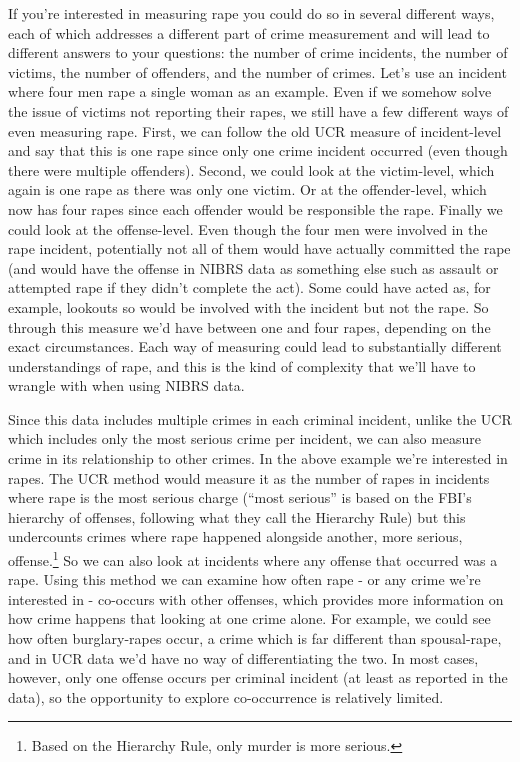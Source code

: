 \documentclass[
]{krantz}
\begin{document}
If you're interested in measuring rape you could do so in
several different ways, each of which addresses a different
part of crime measurement and will lead to different answers
to your questions: the number of crime incidents, the number
of victims, the number of offenders, and the number of
crimes. Let's use an incident where four men rape a single
woman as an example. Even if we somehow solve the issue of
victims not reporting their rapes, we still have a few
different ways of even measuring rape. First, we can follow
the old UCR measure of incident-level and say that this is
one rape since only one crime incident occurred (even though
there were multiple offenders). Second, we could look at the
victim-level, which again is one rape as there was only one
victim. Or at the offender-level, which now has four rapes
since each offender would be responsible the rape. Finally
we could look at the offense-level. Even though the four men
were involved in the rape incident, potentially not all of
them would have actually committed the rape (and would have
the offense in NIBRS data as something else such as assault
or attempted rape if they didn't complete the act). Some
could have acted as, for example, lookouts so would be
involved with the incident but not the rape. So through this
measure we'd have between one and four rapes, depending on
the exact circumstances. Each way of measuring could lead to
substantially different understandings of rape, and this is
the kind of complexity that we'll have to wrangle with when
using NIBRS data.

Since this data includes multiple crimes in each criminal
incident, unlike the UCR which includes only the most
serious crime per incident, we can also measure crime in its
relationship to other crimes. In the above example we're
interested in rapes. The UCR method would measure it as the
number of rapes in incidents where rape is the most serious
charge (``most serious'' is based on the FBI's hierarchy of
offenses, following what they call the Hierarchy Rule) but
this undercounts crimes where rape happened alongside
another, more serious, offense.\footnote{Based on the
  Hierarchy Rule, only murder is more serious.} So we can
also look at incidents where any offense that occurred was a
rape. Using this method we can examine how often rape - or
any crime we're interested in - co-occurs with other
offenses, which provides more information on how crime
happens that looking at one crime alone. For example, we
could see how often burglary-rapes occur, a crime which is
far different than spousal-rape, and in UCR data we'd have
no way of differentiating the two. In most cases, however,
only one offense occurs per criminal incident (at least as
reported in the data), so the opportunity to explore
co-occurrence is relatively limited.
\end{document}
